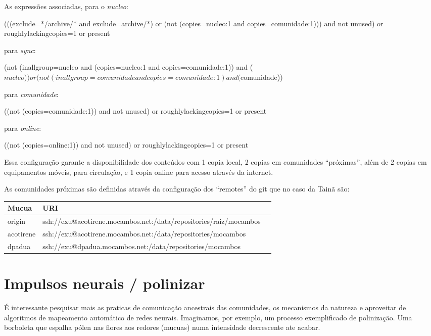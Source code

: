 As expressões associadas, para o \emph{nucleo}:\\
\begin{code}
(((exclude=*/archive/* and exclude=archive/*) or (not
(copies=nucleo:1 and copies=comunidade:1))) and not unused) or
roughlylackingcopies=1 or present
\end{code}

para \emph{sync}:\\
\begin{code}
(not (inallgroup=nucleo and (copies=nucleo:1 and copies=comunidade:1)) 
and ($nucleo)) or (not (inallgroup=comunidade and copies=comunidade:1)
and ($comunidade))
\end{code}

para \emph{comunidade}:\\
\begin{code}
((not (copies=comunidade:1)) and not unused) or
roughlylackingcopies=1 or present
\end{code}

para \emph{online}:\\
\begin{code}
((not (copies=online:1)) and not unused) or
roughlylackingcopies=1 or present
\end{code}


Essa configuração garante a disponibilidade dos conteúdos com 1 copia
local, 2 copias em comunidades ``próximas'', além de 2 copias em
equipamentos móveis, para circulação, e 1 copia online para acesso
através da internet.

As comunidades próximas são definidas através da configuração
dos ``remotes'' do git que no caso da Tainã são:
\begin{table}[h]
  \centering
  \begin{tabularx}{\textwidth}{ X | l  X  }
    \textbf{Mucua} & \textbf{URI} \\ [0.5ex]
    \hline
    origin & ssh://exu@acotirene.mocambos.net:/data/repositories/raiz/mocambos \\
    acotirene & ssh://exu@acotirene.mocambos.net:/data/repositories/mocambos \\
    dpadua & ssh://exu@dpadua.mocambos.net:/data/repositories/mocambos \\
    \hline  
  \end{tabularx}
\end{table}

\section{Impulsos neurais / polinizar}
É interessante pesquisar mais as praticas de comunicação ancestrais
das comunidades, os mecanismos da natureza e aproveitar de algoritmos
de mapeamento automático de redes neurais. Imaginamos, por exemplo, um
processo exemplificado de polinização. Uma borboleta que espalha pólen
nas flores aos redores (mucuas) numa intensidade decrescente ate
acabar.

